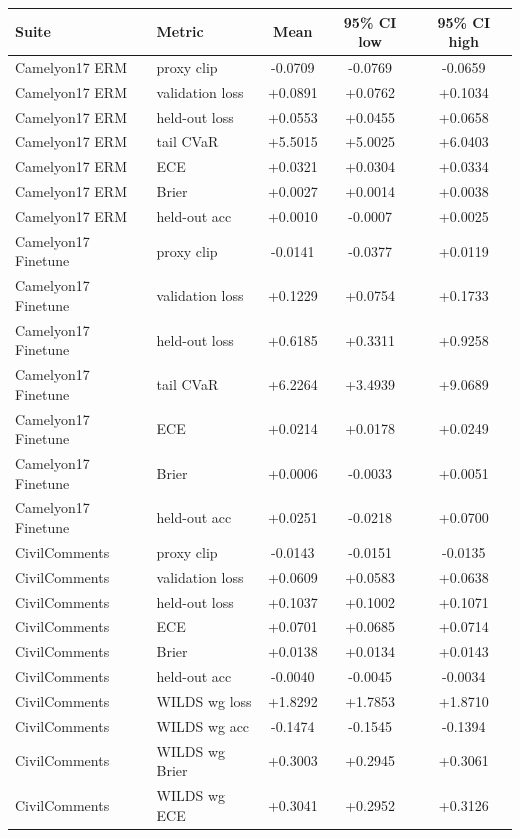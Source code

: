 \begin{tabular}{llccc}
  \toprule
  Suite & Metric & Mean & 95\% CI low & 95\% CI high \\
  \midrule
  Camelyon17 ERM & proxy clip & -0.0709 & -0.0769 & -0.0659 \\
  Camelyon17 ERM & validation loss & +0.0891 & +0.0762 & +0.1034 \\
  Camelyon17 ERM & held-out loss & +0.0553 & +0.0455 & +0.0658 \\
  Camelyon17 ERM & tail CVaR & +5.5015 & +5.0025 & +6.0403 \\
  Camelyon17 ERM & ECE & +0.0321 & +0.0304 & +0.0334 \\
  Camelyon17 ERM & Brier & +0.0027 & +0.0014 & +0.0038 \\
  Camelyon17 ERM & held-out acc & +0.0010 & -0.0007 & +0.0025 \\
  Camelyon17 Finetune & proxy clip & -0.0141 & -0.0377 & +0.0119 \\
  Camelyon17 Finetune & validation loss & +0.1229 & +0.0754 & +0.1733 \\
  Camelyon17 Finetune & held-out loss & +0.6185 & +0.3311 & +0.9258 \\
  Camelyon17 Finetune & tail CVaR & +6.2264 & +3.4939 & +9.0689 \\
  Camelyon17 Finetune & ECE & +0.0214 & +0.0178 & +0.0249 \\
  Camelyon17 Finetune & Brier & +0.0006 & -0.0033 & +0.0051 \\
  Camelyon17 Finetune & held-out acc & +0.0251 & -0.0218 & +0.0700 \\
  CivilComments & proxy clip & -0.0143 & -0.0151 & -0.0135 \\
  CivilComments & validation loss & +0.0609 & +0.0583 & +0.0638 \\
  CivilComments & held-out loss & +0.1037 & +0.1002 & +0.1071 \\
  CivilComments & ECE & +0.0701 & +0.0685 & +0.0714 \\
  CivilComments & Brier & +0.0138 & +0.0134 & +0.0143 \\
  CivilComments & held-out acc & -0.0040 & -0.0045 & -0.0034 \\
  CivilComments & WILDS wg loss & +1.8292 & +1.7853 & +1.8710 \\
  CivilComments & WILDS wg acc & -0.1474 & -0.1545 & -0.1394 \\
  CivilComments & WILDS wg Brier & +0.3003 & +0.2945 & +0.3061 \\
  CivilComments & WILDS wg ECE & +0.3041 & +0.2952 & +0.3126 \\
  \bottomrule
\end{tabular}
